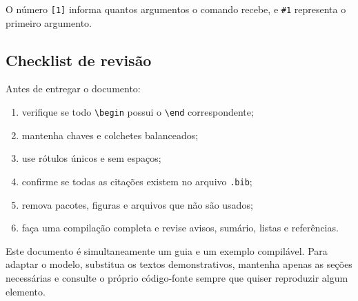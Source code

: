 O número \lstinline|[1]| informa quantos argumentos o comando recebe, e \lstinline|#1| representa o primeiro argumento.

\subsection{Checklist de revisão}

Antes de entregar o documento:

\begin{enumerate}
  \item verifique se todo \lstinline|\begin| possui o \lstinline|\end| correspondente;
  \item mantenha chaves e colchetes balanceados;
  \item use rótulos únicos e sem espaços;
  \item confirme se todas as citações existem no arquivo \texttt{.bib};
  \item remova pacotes, figuras e arquivos que não são usados;
  \item faça uma compilação completa e revise avisos, sumário, listas e referências.
\end{enumerate}

Este documento é simultaneamente um guia e um exemplo compilável. Para adaptar o modelo, substitua os textos demonstrativos, mantenha apenas as seções necessárias e consulte o próprio código-fonte sempre que quiser reproduzir algum elemento.
